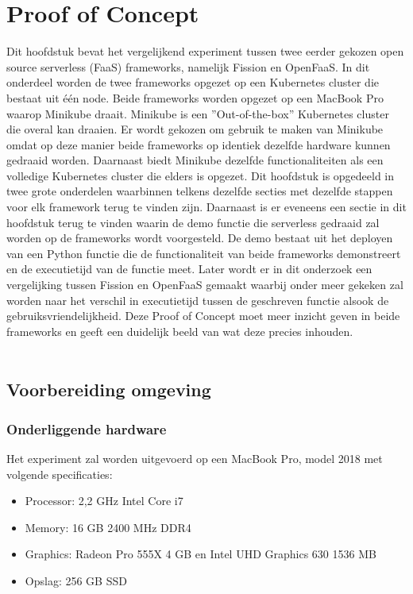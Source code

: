 \chapter{Proof of Concept}
\label{ch:proof-of-concept}
Dit hoofdstuk bevat het vergelijkend experiment tussen twee eerder gekozen open source serverless (FaaS) frameworks, namelijk Fission en OpenFaaS. In dit onderdeel worden de twee frameworks opgezet op een Kubernetes cluster die bestaat uit één node. Beide frameworks worden opgezet op een MacBook Pro waarop Minikube draait. Minikube is een ''Out-of-the-box'' Kubernetes cluster die overal kan draaien. Er wordt gekozen om gebruik te maken van Minikube omdat op deze manier beide frameworks op identiek dezelfde hardware kunnen gedraaid worden. Daarnaast biedt Minikube dezelfde functionaliteiten als een volledige Kubernetes cluster die elders is opgezet. Dit hoofdstuk is opgedeeld in twee grote onderdelen waarbinnen telkens dezelfde secties met dezelfde stappen voor elk framework terug te vinden zijn. Daarnaast is er eveneens een sectie in dit hoofdstuk terug te vinden waarin de demo functie die serverless gedraaid zal worden op de frameworks wordt voorgesteld. De demo bestaat uit het deployen van een Python functie die de functionaliteit van beide frameworks demonstreert en de executietijd van de functie meet. Later wordt er in dit onderzoek een vergelijking tussen Fission en OpenFaaS gemaakt waarbij onder meer gekeken zal worden naar het verschil in executietijd tussen de geschreven functie alsook de gebruiksvriendelijkheid. Deze Proof of Concept moet meer inzicht geven in beide frameworks en geeft een duidelijk beeld van wat deze precies inhouden.
\\\\
\section{Voorbereiding omgeving}
\label{sec:voorbereiding-omgeving}
\subsection{Onderliggende hardware}
Het experiment zal worden uitgevoerd op een MacBook Pro, model 2018 met volgende specificaties:
\begin{itemize}
    \item Processor: 2,2 GHz Intel Core i7
    \item Memory: 16 GB 2400 MHz DDR4
    \item Graphics: Radeon Pro 555X 4 GB en Intel UHD Graphics 630 1536 MB
    \item Opslag: 256 GB SSD
\end{itemize}

